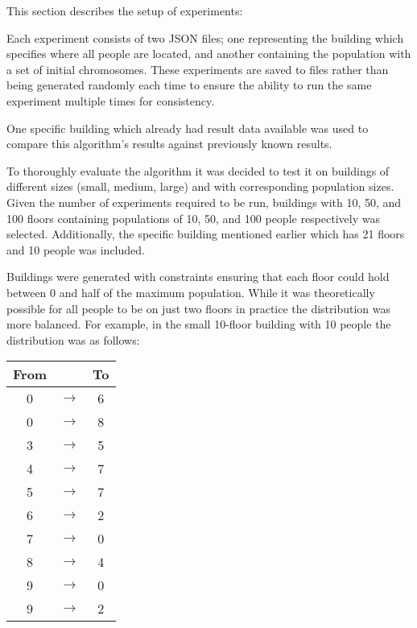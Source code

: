 
This section describes the setup of experiments:

Each experiment consists of two JSON files; one representing the building which specifies where all people are located, and another containing the population with a set of initial chromosomes.
These experiments are saved to files rather than being generated randomly each time to ensure the ability to run the same experiment multiple times for consistency.

One specific building which already had result data available was used to compare this algorithm's results against previously known results.

To thoroughly evaluate the algorithm it was decided to test it on buildings of different sizes (small, medium, large) and with corresponding population sizes.
Given the number of experiments required to be run, buildings with 10, 50, and 100 floors containing populations of 10, 50, and 100 people respectively was selected. Additionally, the specific building mentioned earlier which has 21 floors and 10 people was included.

Buildings were generated with constraints ensuring that each floor could hold between 0 and half of the maximum population.
While it was theoretically possible for all people to be on just two floors in practice the distribution was more balanced. For example, in the small 10-floor building with 10 people the distribution was as follows:

\begin{center}
	\begin{tabular}{c c c}
		\textbf{From} &       & \textbf{To} \\
		\hline
		0             & $\to$ & 6           \\
		0             & $\to$ & 8           \\
		3             & $\to$ & 5           \\
		4             & $\to$ & 7           \\
		5             & $\to$ & 7           \\
		6             & $\to$ & 2           \\
		7             & $\to$ & 0           \\
		8             & $\to$ & 4           \\
		9             & $\to$ & 0           \\
		9             & $\to$ & 2           \\
	\end{tabular}
\end{center}

